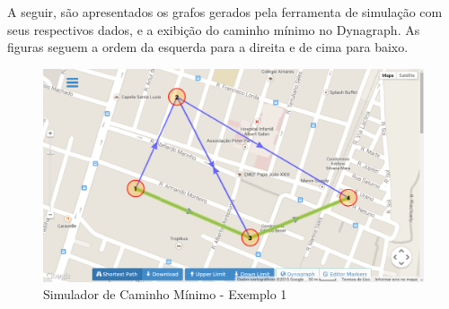 A seguir, são apresentados os grafos gerados pela ferramenta de simulação com seus respectivos dados,
e a exibição do caminho mínimo no Dynagraph. As figuras seguem a ordem da esquerda para a direita e
de cima para baixo.

\begin{figure}[htbp]
\centering
 \includegraphics[width=.70\textwidth]{chapters/fig/validacao/ex1.png}
\caption{Simulador de Caminho Mínimo - Exemplo 1}
\label{fig:ex1}
\end{figure}
\FloatBarrier

